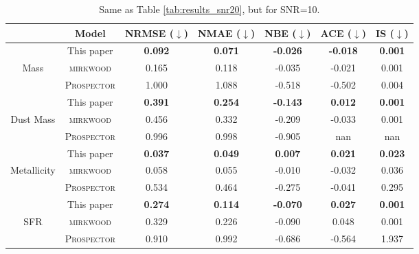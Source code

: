 \documentclass[letterpaper]{article}
\begin{document}
\begin{table*}
\centering
\begin{tabular}{ccccccc}
\toprule
\toprule
& Model &  NRMSE ($\downarrow$) & NMAE ($\downarrow$) & NBE ($\downarrow$) & ACE ($\downarrow$) & IS ($\downarrow$) \\ \midrule
& This paper  &  \textbf{0.092}&  \textbf{0.071}&  \textbf{-0.026}&  \textbf{-0.018}&  \textbf{0.001}\\
Mass & \textsc{mirkwood} &    0.165&  0.118&  -0.035&  -0.021&  0.001\\
& \textsc{Prospector} &  1.000&  1.088&  -0.518&   -0.502&  0.004\\ \midrule
& This paper  &    \textbf{0.391}&   \textbf{0.254}&  \textbf{-0.143}&   \textbf{0.012}&  \textbf{0.001}\\
Dust Mass & \textsc{mirkwood} &  0.456&  0.332&  -0.209&  -0.033& 0.001 \\
& \textsc{Prospector} &  0.996&  0.998& -0.905&  nan &  nan \\ \midrule
& This paper&  \textbf{0.037}&   \textbf{0.049}&  \textbf{0.007}&  \textbf{0.021}&  \textbf{0.023}\\
Metallicity & \textsc{mirkwood}&  0.058&  0.055&   -0.010&  -0.032&  0.036\\
& \textsc{Prospector}&  0.534&  0.464&   -0.275&  -0.041&  0.295\\ \midrule
& This paper&  \textbf{0.274}&   \textbf{0.114}&  \textbf{-0.070}&  \textbf{0.027}&  \textbf{0.001}\\
SFR & \textsc{mirkwood}&   0.329&  0.226&   -0.090&  0.048&  0.001\\
& \textsc{Prospector}&  0.910&  0.992&   -0.686&  -0.564&    1.937\\ \bottomrule
\end{tabular}
\caption{Same as Table \ref{tab:results_snr20}, but for SNR=10.}
\label{tab:results_snr10}
\end{table*}
\end{document}

